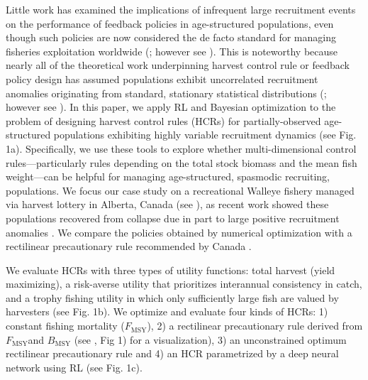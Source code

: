 \documentclass[floatfix,nofootinbib,longbibliography,notitlepage]{revtex4-1}
\def\textfmsy{$F_{\text{MSY}}$}
\def\bmsy{B_{\text{MSY}}}
\begin{document}
Little work has examined the implications of infrequent large recruitment events on the performance of feedback policies in age-structured populations, even though such policies are now considered the de facto standard for managing fisheries exploitation worldwide (\cite{silvar-viladomiu,free-etal-2022}; however see \cite{licandeo-etal-2020}).
This is noteworthy because nearly all of the theoretical work underpinning harvest control rule or feedback policy design has assumed populations exhibit uncorrelated recruitment anomalies originating from standard, stationary statistical distributions (\cite{walters1975optimal,walters-hilborn-1978,reed1979optimal}; however see \cite{parma1990experimental,hawkshaw2015harvest}). 
In this paper, we apply RL and Bayesian optimization to the problem of designing harvest control rules (HCRs) for partially-observed age-structured populations exhibiting highly variable recruitment dynamics (see Fig. 1a).  
Specifically, we use these tools to explore whether multi-dimensional control rules—particularly rules depending on the total stock biomass and the mean fish weight—can be helpful for managing age-structured, spasmodic recruiting, populations. 
We focus our case study on a recreational Walleye fishery managed via harvest lottery in Alberta, Canada (see \cite{sullivan2003}), as recent work showed these populations recovered from collapse due in part to large positive recruitment anomalies \cite{post-etal-2002,cahill2022}. 
We compare the policies obtained by numerical optimization with a rectilinear precautionary rule recommended by Canada \cite{dfo2006}.  

We evaluate HCRs with three types of utility functions: total harvest (yield maximizing), a risk-averse utility that prioritizes interannual consistency in catch, and a trophy fishing utility in which only sufficiently large fish are valued by harvesters (see Fig. 1b). 
We optimize and evaluate four kinds of HCRs: 1) constant fishing mortality (\textfmsy), 2) a rectilinear precautionary rule derived from \textfmsy and $\bmsy$ (see \cite{dfo2006}, Fig 1) for a visualization), 3) an unconstrained optimum rectilinear precautionary rule and 4) an HCR parametrized by a deep neural network using RL (see Fig. 1c).
\end{document}
